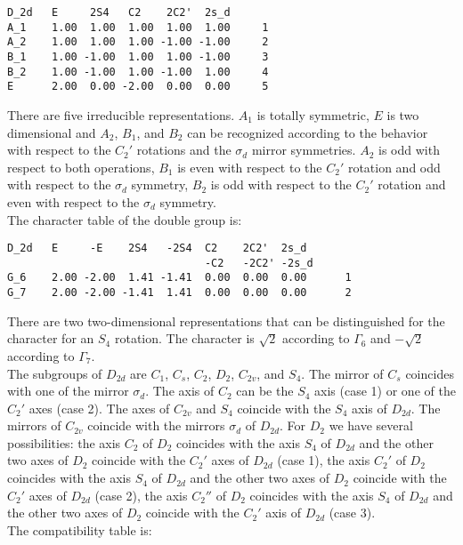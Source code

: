 \documentclass[12pt,a4paper,twoside]{report}
\begin{document}
\begin{tcolorbox}
\begin{footnotesize}
\begin{verbatim}
D_2d   E     2S4   C2    2C2'  2s_d
A_1    1.00  1.00  1.00  1.00  1.00     1
A_2    1.00  1.00  1.00 -1.00 -1.00     2
B_1    1.00 -1.00  1.00  1.00 -1.00     3
B_2    1.00 -1.00  1.00 -1.00  1.00     4
E      2.00  0.00 -2.00  0.00  0.00     5
\end{verbatim}
\end{footnotesize}
\end{tcolorbox}

There are five irreducible representations. $A_1$ is totally symmetric, $E$
is two dimensional and $A_2$, $B_1$, and $B_2$ can be recognized according to
the behavior with respect to the $C_2'$ rotations and the $\sigma_d$
mirror symmetries. $A_2$ is odd with respect to both operations, $B_1$ is
even with respect to the $C_2'$ rotation and odd with respect to the
$\sigma_d$ symmetry, $B_2$ is odd with respect to the $C_2'$ rotation and 
even with respect to the $\sigma_d$ symmetry. \\
The character table of the double group is:

\begin{tcolorbox}
\begin{footnotesize}
\begin{verbatim}
D_2d   E     -E    2S4   -2S4  C2    2C2'  2s_d 
                               -C2   -2C2' -2s_d
G_6    2.00 -2.00  1.41 -1.41  0.00  0.00  0.00      1
G_7    2.00 -2.00 -1.41  1.41  0.00  0.00  0.00      2
\end{verbatim}
\end{footnotesize}
\end{tcolorbox}

There are two two-dimensional representations that can be distinguished
for the character for an $S_4$ rotation. The character is $\sqrt{2}$
according to $\Gamma_6$ and $-\sqrt{2}$ according to $\Gamma_7$. \\
The subgroups of $D_{2d}$ are $C_1$, $C_s$, $C_2$, $D_2$, $C_{2v}$, 
and $S_4$. The mirror of $C_s$ coincides with one of the mirror $\sigma_d$. 
The axis of $C_2$ can be the $S_4$ axis (case 1) or one of the 
$C_2'$ axes (case 2). The axes of $C_{2v}$ and $S_4$
coincide with the $S_4$ axis of $D_{2d}$. The mirrors of $C_{2v}$
coincide with the mirrors $\sigma_d$ of $D_{2d}$. For $D_2$ we have several 
possibilities: the axis $C_2$ of $D_2$ coincides with the axis $S_4$
of $D_{2d}$ and the other two axes of $D_2$ coincide with the $C_2'$ axes
of $D_{2d}$ (case 1), the axis $C_2'$ of $D_2$ coincides with the axis $S_4$
of $D_{2d}$ and the other two axes of $D_2$ coincide with the $C_2'$ axes
of $D_{2d}$ (case 2), the axis $C_2''$ of $D_2$ coincides with the axis 
$S_4$ of $D_{2d}$ and the other two axes of $D_2$ coincide with the $C_2'$ 
axis of $D_{2d}$ (case 3). \\
The compatibility table is:
\end{document}
